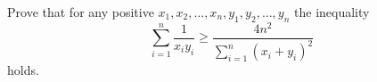 Prove that for any positive $ x_1,x_2,\ldots,x_n,y_1,y_2,\ldots,y_n$ the inequality\[ \sum_{i=1}^n\frac1{x_iy_i}\ge\frac{4n^2}{\sum_{i=1}^n(x_i+y_i)^2}

\] holds.